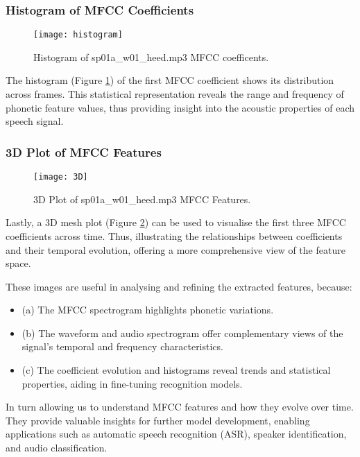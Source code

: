 \documentclass{article}
\begin{document}
\subsubsection{Histogram of MFCC Coefficients}

\begin{figure}[!h]
\begin{center}
\texttt{[image: histogram]}
\end{center}
\caption{\label{fig:histogram} Histogram of sp01a\_w01\_heed.mp3 MFCC coefficents.}
\end{figure}

The histogram (Figure \ref{fig:histogram}) of the first MFCC coefficient shows its distribution across frames. This statistical representation reveals the range and frequency of phonetic feature values, thus providing insight into the acoustic properties of each speech signal.


\subsubsection{3D Plot of MFCC Features}

\begin{figure}[!h]
\begin{center}
\texttt{[image: 3D]}
\end{center}
\caption{\label{fig:3D} 3D Plot of sp01a\_w01\_heed.mp3 MFCC Features.}
\end{figure}

Lastly, a 3D mesh plot (Figure \ref{fig:3D}) can be used to visualise the first three MFCC coefficients across time. Thus, illustrating the relationships between coefficients and their temporal evolution, offering a more comprehensive view of the feature space.

These images are useful in analysing and refining the extracted features, because: 
\begin{itemize}
	\item (a) The MFCC spectrogram highlights phonetic variations.
	\item (b) The waveform and audio spectrogram offer complementary views of the signal’s temporal and frequency characteristics.
	\item (c) The coefficient evolution and histograms reveal trends and statistical properties, aiding in fine-tuning recognition models.
\end{itemize}


In turn allowing us to understand MFCC features and how they evolve over time. They provide valuable insights for further model development, enabling applications such as automatic speech recognition (ASR), speaker identification, and audio classification.
\end{document}

